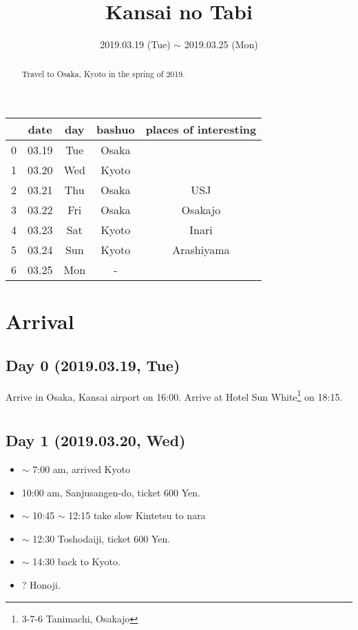 \documentclass{article}
\title{Kansai no Tabi}
\date{2019.03.19 (Tue) $\sim$ 2019.03.25 (Mon)}
\begin{document}
\maketitle

\begin{abstract}
Travel to Osaka, Kyoto in the spring of 2019.
\end{abstract}

\begin{tabular}{ c | c | c | c | c }
  & date   & day  & bashuo & places of interesting \\\hline
0 & 03.19  & Tue  & Osaka & \\
1 & 03.20  & Wed  & Kyoto & \\
2 & 03.21  & Thu  & Osaka & USJ \\
3 & 03.22  & Fri  & Osaka & Osakajo \\
4 & 03.23  & Sat  & Kyoto & Inari \\
5 & 03.24  & Sun  & Kyoto & Arashiyama \\
6 & 03.25  & Mon  & - & \\
\end{tabular}


\section{Arrival}
\subsection{Day 0 (2019.03.19, Tue)}
Arrive in Osaka, Kansai airport on 16:00.
Arrive at Hotel Sun White\footnote{3-7-6 Tanimachi, Osakajo} on 18:15.

\section{}
\subsection{Day 1 (2019.03.20, Wed)}
\begin{itemize}
\item $\sim$ 7:00 am, arrived Kyoto
\item 10:00 am, Sanjusangen-do, ticket 600 Yen.
\item $\sim$ 10:45 $\sim$ 12:15 take slow Kintetsu to nara
\item $\sim$ 12:30 Toshodaiji, ticket 600 Yen.
\item $\sim$ 14:30 back to Kyoto.
\item ? Honoji.
\end{itemize}
\end{document}
